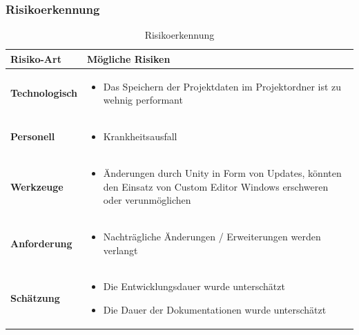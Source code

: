 \subsubsection{Risikoerkennung}
\begin{table}[H]
    \centering
    \settowidth{}
    \setlength\extrarowheight{2pt}
    \begin{tabulary}{1.0\textwidth}{| m{3cm} | m{9cm} |}
      \hline
      \textbf{Risiko-Art} &
      \textbf{Mögliche Risiken}\\
      \hline
      \textbf{Technologisch} &
        \begin{itemize}
            \item Das Speichern der Projektdaten im Projektordner ist zu wehnig performant 
        \end{itemize}\\
      \hline
      \textbf{Personell} &
      \begin{itemize}
        \item Krankheitsausfall
        \end{itemize}\\
      \hline
      \textbf{Werkzeuge} &
      \begin{itemize}
        \item Änderungen durch Unity in Form von Updates, könnten den Einsatz von Custom Editor Windows erschweren oder verunmöglichen
        \end{itemize}\\
      \hline
      \textbf{Anforderung} &
        \begin{itemize}
        \item Nachträgliche Änderungen / Erweiterungen werden verlangt
        \end{itemize}\\
      \hline
      \textbf{Schätzung} &
      \begin{itemize}
        \item Die Entwicklungsdauer wurde unterschätzt
        \item Die Dauer der Dokumentationen wurde unterschätzt
      \end{itemize}\\
      \hline
    \end{tabulary}
    \caption{Risikoerkennung}
  \end{table}
